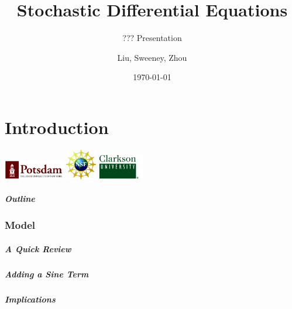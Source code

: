 \documentclass{beamer}   %
\begin{document}
\part{Introduction}


\title{Stochastic Differential Equations}
\subtitle{??? Presentation}

\author{Liu, Sweeney, Zhou}
\date{\today}

\begin{frame}[plain]
  \titlepage
  \begin{center}
  \includegraphics[width=0.2\textwidth]{SUNYPotsdam}
  \includegraphics[width=0.1\textwidth]{nsf_logobig}
  \includegraphics[width=0.15\textwidth]{clarksonGreen}
\end{center}
\end{frame}

\begin{frame}
  \frametitle{Outline}
\end{frame}

\section{Model}

\begin{frame}
    \frametitle{A Quick Review}

\end{frame}




\begin{frame}
    \frametitle{Adding a Sine Term}

\end{frame}




\begin{frame}
    \frametitle{Implications}

\end{frame}
\end{document}
